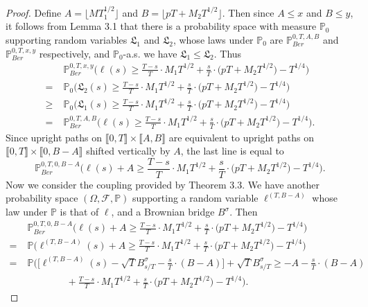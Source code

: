 \documentclass[12pt]{article}
\begin{document}
\begin{proof}
		Define $A = \lfloor MT_1^{1/2}\rfloor$ and $B = \lfloor pT + M_2 T^{1/2}\rfloor$. Then since $A\leq x$ and $B\leq y$, it follows from Lemma 3.1 that there is a probability space with measure $\mathbb{P}_0$ supporting random variables $\mathfrak{L}_1$ and $\mathfrak{L}_2$, whose laws under $\mathbb{P}_0$ are $\mathbb{P}^{0,T,A,B}_{Ber}$ and $\mathbb{P}^{0,T,x,y}_{Ber}$ respectively, and $\mathbb{P}_0$-a.s. we have $\mathfrak{L}_1\leq \mathfrak{L}_2$. Thus
		\begin{align*}
		&\mathbb{P}^{0,T,x,y}_{Ber}\Big( \ell(s)  \geq \frac{T-s}{T} \cdot M_1 T^{1/2} + \frac{s}{T} \cdot \big(p T + M_2 T^{1/2}\big) - T^{1/4} \Big)\\
		= \; & \mathbb{P}_0\Big( \mathfrak{L}_2(s)  \geq \frac{T-s}{T} \cdot M_1 T^{1/2} + \frac{s}{T} \cdot \big(p T + M_2 T^{1/2}\big) - T^{1/4} \Big)\\
		\geq \; & \mathbb{P}_0\Big( \mathfrak{L}_1(s)  \geq \frac{T-s}{T} \cdot M_1 T^{1/2} + \frac{s}{T} \cdot \big(p T + M_2 T^{1/2}\big) - T^{1/4} \Big)\\
		= \; & \mathbb{P}^{0,T,A,B}_{Ber}\Big( \ell(s)  \geq \frac{T-s}{T} \cdot M_1 T^{1/2} + \frac{s}{T} \cdot \big(p T + M_2 T^{1/2}\big) - T^{1/4} \Big).
		\end{align*}
		Since upright paths on $\llbracket 0,T\rrbracket \times \llbracket A,B\rrbracket$ are equivalent to upright paths on $\llbracket 0,T\rrbracket \times \llbracket 0, B-A\rrbracket$ shifted vertically by $A$, the last line is equal to
		\[
		\mathbb{P}^{0,T,0,B-A}_{Ber}\Big( \ell(s) + A  \geq \frac{T-s}{T} \cdot M_1 T^{1/2} + \frac{s}{T} \cdot \big(p T + M_2 T^{1/2}\big) - T^{1/4} \Big).
		\]
		Now we consider the coupling provided by Theorem 3.3. We have another probability space $(\Omega,\mathcal{F},\mathbb{P})$ supporting a random variable $\ell^{(T,B-A)}$ whose law under $\mathbb{P}$ is that of $\ell$, and a Brownian bridge $B^\sigma$. Then 
		\begin{align*}
		&\mathbb{P}^{0,T,0,B-A}_{Ber}\Big( \ell(s) + A  \geq \frac{T-s}{T} \cdot M_1 T^{1/2} + \frac{s}{T} \cdot \big(p T + M_2 T^{1/2}\big) - T^{1/4} \Big)\\
		= \; & \mathbb{P}\Big( \ell^{(T,B-A)}(s) + A \geq \frac{T-s}{T} \cdot M_1 T^{1/2} + \frac{s}{T} \cdot \big(p T + M_2 T^{1/2}\big) - T^{1/4} \Big)\\
		= \; & \mathbb{P}\Big( \Big[\ell^{(T,B-A)}(s) - \sqrt{T} B^\sigma_{s/T} - \frac{s}{T}\cdot(B-A)\Big] + \sqrt{T}B^\sigma_{s/T} \geq -A-\frac{s}{T}\cdot(B-A) \\
		&\qquad\qquad + \frac{T-s}{T} \cdot M_1 T^{1/2} + \frac{s}{T} \cdot \big(p T + M_2 T^{1/2}\big) - T^{1/4} \Big).

\end{align*}
\end{proof}
\end{document}
